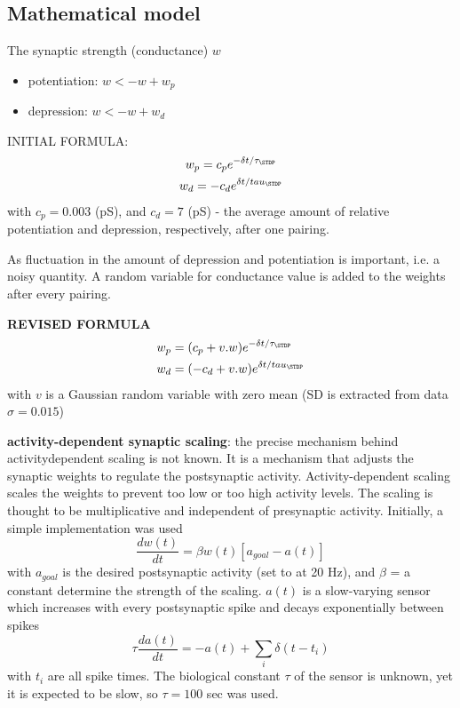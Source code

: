 \subsection{Mathematical model}

The synaptic strength (conductance) $w$
\begin{itemize}
  \item potentiation: $w <- w + w_p$
  
  \item depression: $w <- w + w_d$
\end{itemize}

INITIAL FORMULA:
\begin{gather}
w_p = c_p e^{-\delta t/\tau_\STDP} \\
w_d = -c_d e^{\delta t/tau_\STDP}
\end{gather}
with $c_p = 0.003$ (pS), and $c_d=7$ (pS) - the average amount of relative
potentiation and depression, respectively, after one pairing.

As fluctuation in the amount of depression and potentiation is important, i.e. a
noisy quantity. A random variable for conductance value is added to the weights
after every pairing.

{\bf REVISED FORMULA}
\begin{equation}
\begin{split}
\label{eq:vanRossum_formula-2000}
w_p &= (c_p + v. w) e^{-\delta t/\tau_\STDP} \\
w_d &= (-c_d + v.w) e^{\delta t/tau_\STDP}
\end{split}
\end{equation}
with $v$ is a Gaussian random variable with zero mean (SD is extracted from
data $\sigma = 0.015$)


{\bf activity-dependent synaptic scaling}: the precise mechanism behind activitydependent
scaling is not known. It is  a mechanism that adjusts the synaptic
weights to regulate the postsynaptic activity.
Activity-dependent scaling scales the weights to prevent too low or too high
activity levels. The scaling is thought to be multiplicative and independent
of presynaptic activity. Initially, a simple implementation was used
\begin{equation}
\frac{dw(t)}{dt} = \beta w(t) \left[ a_{goal} - a(t) \right]
\label{eq:active-dependent-scaling-simple}
\end{equation}
with $a_{goal}$ is the desired postsynaptic activity (set to at 20 Hz), and 
$\beta$ = a constant determine the strength of the scaling. $a(t)$ is a
slow-varying sensor which increases with every postsynaptic spike and decays 
exponentially between spikes
\begin{equation}
\tau \frac{da(t)}{dt} = -a(t) + \sum_i \delta(t-t_i)
\end{equation}
with $t_i$ are all spike times. The biological constant $\tau$ of the sensor is
unknown, yet it is expected to be slow, so $\tau = 100$ sec was used.


